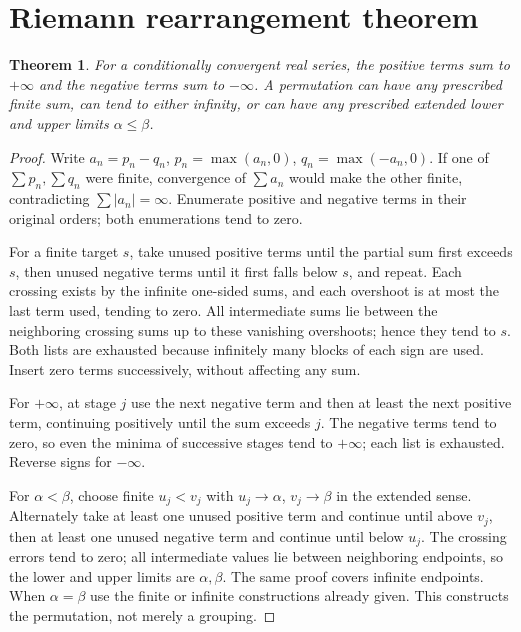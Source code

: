 \documentclass[11pt,oneside,a4paper]{book}
\newtheorem{theorem}{Theorem}[chapter]
\theoremstyle{definition}
\theoremstyle{remark}
\newcommand{\abs}[1]{\lvert#1\rvert}
\newcommand{\KEntry}[2]{\Needspace{7\baselineskip}\section{#2}\label{#1}{\small\sffamily\color{black!60}\detokenize{#1}}\par}
\begin{document}
\KEntry{K03.11.rearrange_conditional}{Riemann rearrangement theorem}
\begin{theorem}
For a conditionally convergent real series, the positive terms sum to $+\infty$ and the negative terms sum to $-\infty$. A permutation can have any prescribed finite sum, can tend to either infinity, or can have any prescribed extended lower and upper limits $\alpha\leq\beta$.
\end{theorem}
\begin{proof}
Write $a_n=p_n-q_n$, $p_n=\max(a_n,0)$, $q_n=\max(-a_n,0)$. If one of $\sum p_n,\sum q_n$ were finite, convergence of $\sum a_n$ would make the other finite, contradicting $\sum\abs{a_n}=\infty$. Enumerate positive and negative terms in their original orders; both enumerations tend to zero.

For a finite target $s$, take unused positive terms until the partial sum first exceeds $s$, then unused negative terms until it first falls below $s$, and repeat. Each crossing exists by the infinite one-sided sums, and each overshoot is at most the last term used, tending to zero. All intermediate sums lie between the neighboring crossing sums up to these vanishing overshoots; hence they tend to $s$. Both lists are exhausted because infinitely many blocks of each sign are used. Insert zero terms successively, without affecting any sum.

For $+\infty$, at stage $j$ use the next negative term and then at least the next positive term, continuing positively until the sum exceeds $j$. The negative terms tend to zero, so even the minima of successive stages tend to $+\infty$; each list is exhausted. Reverse signs for $-\infty$.

For $\alpha<\beta$, choose finite $u_j<v_j$ with $u_j\to\alpha$, $v_j\to\beta$ in the extended sense. Alternately take at least one unused positive term and continue until above $v_j$, then at least one unused negative term and continue until below $u_j$. The crossing errors tend to zero; all intermediate values lie between neighboring endpoints, so the lower and upper limits are $\alpha,\beta$. The same proof covers infinite endpoints. When $\alpha=\beta$ use the finite or infinite constructions already given. This constructs the permutation, not merely a grouping.
\end{proof}
\end{document}

